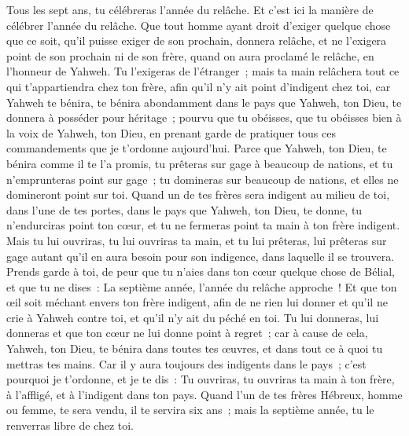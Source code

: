\begin{multicols}{2}
\VerseOne{}Tous les sept ans, tu célébreras l'année du relâche.
Et c'est ici la manière de célébrer l'année du relâche. Que tout homme ayant droit d'exiger quelque chose que ce soit, qu'il puisse exiger de son prochain, donnera relâche, et ne l'exigera point de son prochain ni de son frère, quand on aura proclamé le relâche, en l'honneur de Yahweh.
Tu l'exigeras de l'étranger~; mais ta main relâchera tout ce qui t'appartiendra chez ton frère,
afin qu'il n'y ait point d'indigent chez toi, car Yahweh te bénira, te bénira abondamment dans le pays que Yahweh, ton Dieu, te donnera à posséder pour héritage~;
pourvu que tu obéisses, que tu obéisses bien à la voix de Yahweh, ton Dieu, en prenant garde de pratiquer tous ces commandements que je t'ordonne aujourd'hui.
Parce que Yahweh, ton Dieu, te bénira comme il te l'a promis, tu prêteras sur gage à beaucoup de nations, et tu n'emprunteras point sur gage~; tu domineras sur beaucoup de nations, et elles ne domineront point sur toi.
Quand un de tes frères sera indigent au milieu de toi, dans l'une de tes portes, dans le pays que Yahweh, ton Dieu, te donne, tu n'endurciras point ton cœur, et tu ne fermeras point ta main à ton frère indigent.
Mais tu lui ouvriras, tu lui ouvriras ta main, et tu lui prêteras, lui prêteras sur gage autant qu'il en aura besoin pour son indigence, dans laquelle il se trouvera.
Prends garde à toi, de peur que tu n'aies dans ton cœur quelque chose de Bélial, et que tu ne dises~: La septième année, l'année du relâche approche~! Et que ton œil soit méchant envers ton frère indigent, afin de ne rien lui donner et qu'il ne crie à Yahweh contre toi, et qu'il n'y ait du péché en toi.
Tu lui donneras, lui donneras et que ton cœur ne lui donne point à regret~; car à cause de cela, Yahweh, ton Dieu, te bénira dans toutes tes œuvres, et dans tout ce à quoi tu mettras tes mains.
Car il y aura toujours des indigents dans le pays~; c'est pourquoi je t'ordonne, et je te dis~: Tu ouvriras, tu ouvriras ta main à ton frère, à l'affligé, et à l'indigent dans ton pays.
Quand l'un de tes frères Hébreux, homme ou femme, te sera vendu, il te servira six ans~; mais la septième année, tu le renverras libre de chez toi.

\end{multicols}

